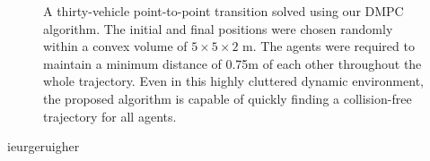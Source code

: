 \begin{figure}[t]
	\centering
	\setlength{}
	
	\caption{A thirty-vehicle point-to-point transition solved using our DMPC algorithm. The initial and final positions were chosen randomly within a convex volume of $5 \times 5 \times 2$ m. The agents were required to maintain a minimum distance of 0.75m of each other throughout the whole trajectory. Even in this highly cluttered dynamic environment, the proposed algorithm is capable of quickly finding a collision-free trajectory for all agents.}
	\label{fig:30_random}
\end{figure}

ieurgeruigher





